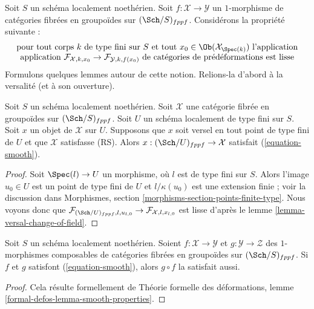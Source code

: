 \noindent
Soit $S$ un schéma localement noethérien. Soit
$f : \mathcal{X} \to \mathcal{Y}$ un $1$-morphisme de catégories fibrées en
groupoïdes sur $(\Sch/S)_{fppf}$. Considérons la propriété suivante :
\begin{equation}
\label{equation-smooth}
\begin{matrix}
\text{pour tout corps }k\text{ de type fini sur }S
\text{ et tout }x_0 \in \Ob(\mathcal{X}_{\Spec(k)})\text{ l'application}\\
\text{application }
\mathcal{F}_{\mathcal{X}, k, x_0} \to \mathcal{F}_{\mathcal{Y}, k, f(x_0)}
\text{ de catégories de prédéformations est lisse}
\end{matrix}
\end{equation}
Formulons quelques lemmes autour de cette notion. Relions-la d'abord à la
versalité (et à son ouverture).

\begin{lemma}
\label{lemma-versal-smooth}
Soit $S$ un schéma localement noethérien. Soit $\mathcal{X}$ une catégorie
fibrée en groupoïdes sur $(\Sch/S)_{fppf}$. Soit $U$ un schéma localement de
type fini sur $S$. Soit $x$ un objet de $\mathcal{X}$ sur $U$. Supposons que
$x$ soit versel en tout point de type fini de $U$ et que $\mathcal{X}$
satisfasse (RS). Alors $x : (\Sch/U)_{fppf} \to \mathcal{X}$ satisfait
(\ref{equation-smooth}).
\end{lemma}

\begin{proof}
Soit $\Spec(l) \to U$ un morphisme, où $l$ est de type fini sur $S$. Alors
l'image $u_0 \in U$ est un point de type fini de $U$ et
$l/\kappa(u_0)$ est une extension finie ; voir la discussion dans Morphismes,
section \ref{morphisms-section-points-finite-type}. Nous voyons donc que
$\mathcal{F}_{(\Sch/U)_{fppf}, l, u_{l, 0}} \to
\mathcal{F}_{\mathcal{X}, l, x_{l, 0}}$
est lisse d'après le lemme \ref{lemma-versal-change-of-field}.
\end{proof}

\begin{lemma}
\label{lemma-composition-smooth}
Soit $S$ un schéma localement noethérien. Soient
$f : \mathcal{X} \to \mathcal{Y}$ et $g : \mathcal{Y} \to \mathcal{Z}$ des
$1$-morphismes composables de catégories fibrées en groupoïdes sur
$(\Sch/S)_{fppf}$. Si $f$ et $g$ satisfont (\ref{equation-smooth}), alors
$g \circ f$ la satisfait aussi.
\end{lemma}

\begin{proof}
Cela résulte formellement de Théorie formelle des déformations, lemme
\ref{formal-defos-lemma-smooth-properties}.
\end{proof}

